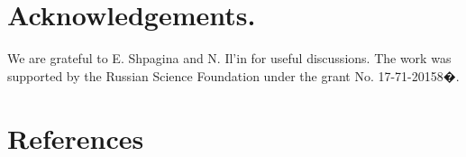 \documentclass[a4paper]{jpconf}
\renewcommand\[{\begin{equation}}
\renewcommand\]{\end{equation}}
\newcommand{\A}{{\cal A}}
\begin{document}






\section*{Acknowledgements.} We are grateful to E. Shpagina and N. Il'in for useful discussions. The work was supported by the Russian Science Foundation under the grant No. 17-71-20158�.

\section*{References}
\end{document}
